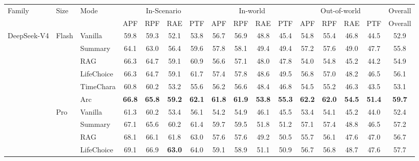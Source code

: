 \documentclass{llmxive}
\providecommand{\arraystretch}{0.95}
\begin{document}
\begin{table}[!htbp]
\centering
\scriptsize
\setlength{\tabcolsep}{5.5pt}
\renewcommand{\arraystretch}{0.85}
\setlength{\aboverulesep}{0.2ex}
\setlength{\belowrulesep}{0.2ex}
\begin{tabular}{lllccccccccccccc}
\toprule
Family & Size & Mode & \multicolumn{4}{c}{In-Scenario} & \multicolumn{4}{c}{In-world} & \multicolumn{4}{c}{Out-of-world} & Overall \\
\cmidrule(lr){4-7} \cmidrule(lr){8-11} \cmidrule(lr){12-15} \cmidrule(lr){16-16}
 & & & APF & RPF & RAE & PTF & APF & RPF & RAE & PTF & APF & RPF & RAE & PTF & Overall \\
\midrule
\multirow[t]{12}{*}{DeepSeek-V4} & \multirow[t]{6}{*}{Flash} & Vanilla & 59.8 & 59.3 & 52.1 & 53.8 & 56.7 & 56.9 & 48.8 & 45.4 & 54.8 & 55.4 & 46.8 & 44.5 & 52.9 \\
 &  & Summary & 64.1 & 63.0 & 56.4 & 59.6 & 57.8 & 58.1 & 49.4 & 49.4 & 57.2 & 57.6 & 49.0 & 47.7 & 55.8 \\
 &  & RAG & 66.3 & 64.7 & 59.1 & 60.9 & 56.6 & 57.1 & 48.0 & 47.8 & 54.0 & 54.8 & 45.2 & 44.2 & 54.9 \\
 &  & LifeChoice & 66.3 & 64.7 & 59.1 & 61.7 & 57.4 & 57.8 & 48.6 & 49.5 & 56.8 & 57.0 & 48.2 & 46.5 & 56.1 \\
 &  & TimeChara & 60.8 & 60.2 & 53.2 & 55.6 & 56.2 & 56.6 & 48.4 & 46.8 & 54.5 & 55.2 & 46.3 & 43.5 & 53.1 \\
 &  & \cellcolor{yellow!15} Arc & \cellcolor{yellow!15} \textbf{66.8} & \cellcolor{yellow!15} \textbf{65.8} & \cellcolor{yellow!15} \textbf{59.2} & \cellcolor{yellow!15} \textbf{62.1} & \cellcolor{yellow!15} \textbf{61.8} & \cellcolor{yellow!15} \textbf{61.9} & \cellcolor{yellow!15} \textbf{53.8} & \cellcolor{yellow!15} \textbf{55.3} & \cellcolor{yellow!15} \textbf{62.2} & \cellcolor{yellow!15} \textbf{62.0} & \cellcolor{yellow!15} \textbf{54.5} & \cellcolor{yellow!15} \textbf{51.4} & \cellcolor{yellow!15} \textbf{59.7} \\
\cmidrule(l){2-16}
 & \multirow[t]{6}{*}{Pro} & Vanilla & 61.3 & 60.2 & 53.4 & 56.1 & 54.2 & 54.9 & 46.1 & 45.5 & 53.4 & 54.1 & 45.2 & 44.0 & 52.4 \\
 &  & Summary & 67.1 & 65.6 & 60.2 & 61.4 & 59.7 & 59.5 & 51.8 & 51.2 & 57.1 & 57.4 & 48.8 & 46.5 & 57.2 \\
 &  & RAG & 68.1 & 66.1 & 61.8 & 63.0 & 57.6 & 57.6 & 49.2 & 50.5 & 55.7 & 56.1 & 47.6 & 47.0 & 56.7 \\
 &  & LifeChoice & 69.1 & 66.9 & \textbf{63.0} & 64.0 & 59.1 & 58.9 & 51.1 & 50.9 & 56.7 & 56.8 & 48.7 & 47.6 & 57.7 \\

\end{tabular}
\end{table}
\end{document}
